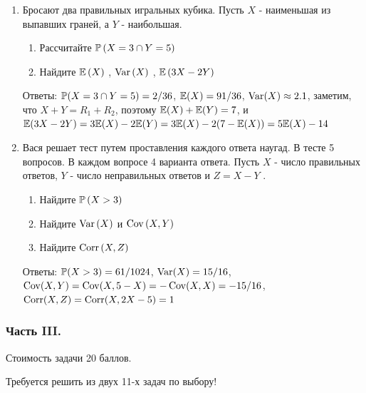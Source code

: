 \documentclass[12pt, a4paper]{article}\usepackage[]{graphicx}\usepackage[]{color}
\begin{document}
\begin{enumerate}
\item Бросают два правильных игральных кубика. Пусть  $X$  - наименьшая из выпавших граней, а  $Y$  - наибольшая.
\begin{enumerate}
\item Рассчитайте  $\P\left(X=3\cap Y=5\right)$
\item Найдите  $\E\left(X\right)$ ,  $\Var\left(X\right)$ ,  $\E\left(3X-2Y\right)$
\end{enumerate}
Ответы: $\P(X=3 \cap Y=5)=2/36$, $\E(X)=91/36$, $\Var(X)\approx 2.1$, заметим, что $X+Y=R_1+R_2$, поэтому $\E(X)+\E(Y)=7$, и $\E(3X-2Y)=3\E(X)-2\E(Y)=3\E(X)-2(7-\E(X))=5\E(X)-14$

\item Вася решает тест путем проставления каждого ответа наугад. В тесте 5 вопросов. В каждом вопросе 4 варианта ответа. Пусть  $X$  - число правильных ответов,  $Y$  - число неправильных ответов и  $Z=X-Y$ .
\begin{enumerate}
\item Найдите  $\P\left(X>3\right)$
\item Найдите  $\Var\left(X\right)$  и  $\Cov\left(X,Y\right)$
\item Найдите  $\Corr\left(X,Z\right)$
\end{enumerate}

Ответы: $\P(X>3)=61/1024$, $\Var(X)=15/16$, $\Cov(X,Y)=\Cov(X,5-X)=-\Cov(X,X)=-15/16$, $\Corr(X,Z)=\Corr(X,2X-5)=1$
\end{enumerate}

\subsubsection*{Часть III.}

Стоимость задачи 20 баллов.

Требуется решить {\bf {}} из двух 11-х задач по выбору!
\end{document}
